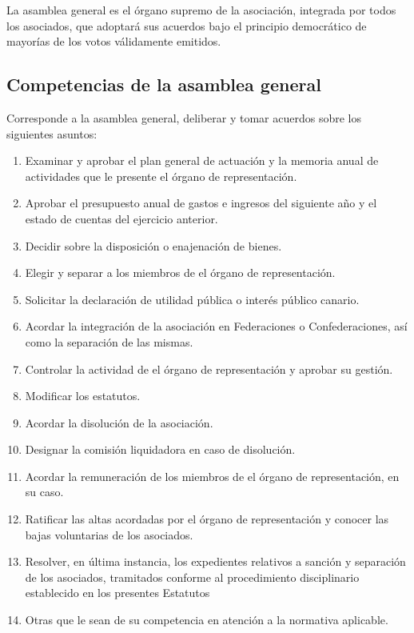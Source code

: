 \documentclass[a4paper, 12pt, oneside]{book}
\begin{document}
La asamblea general es el órgano supremo de la asociación, integrada por todos los asociados, que adoptará sus acuerdos bajo el principio democrático de mayorías de los votos válidamente emitidos.

\subsection{Competencias de la asamblea general}

Corresponde a la asamblea general, deliberar y tomar acuerdos sobre los siguientes asuntos:

\begin{enumerate}
    \item Examinar y aprobar el plan general de actuación y la memoria anual de actividades que le presente el órgano de representación. 
    \item Aprobar el presupuesto anual de gastos e ingresos del siguiente año y el estado de cuentas del ejercicio anterior. 
    \item Decidir sobre la disposición o enajenación de bienes. 
    \item Elegir y separar a los miembros de el órgano de representación. 
    \item Solicitar la declaración de utilidad pública o interés público canario.
    \item Acordar la integración de la asociación en Federaciones o Confederaciones, así como la separación de las mismas. 
    \item Controlar la actividad de el órgano de representación y aprobar su gestión. 
    \item Modificar los estatutos. 
    \item Acordar la disolución de la asociación. 
    \item Designar la comisión liquidadora en caso de disolución. 
    \item Acordar la remuneración de los miembros de el órgano de representación, en su caso. 
    \item Ratificar las altas acordadas por el órgano de representación y conocer las bajas voluntarias de los asociados.
    \item Resolver, en última instancia, los expedientes relativos a sanción y separación de los asociados, tramitados conforme al procedimiento disciplinario establecido en los presentes Estatutos
    \item Otras que le sean de su competencia en atención a la normativa aplicable. 
\end{enumerate}
\end{document}

